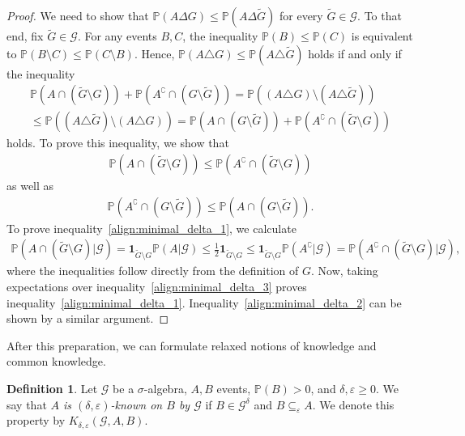 \documentclass[a4paper, 10pt]{article}
\numberwithin{theorem}{section}
\theoremstyle{definition}
\newtheorem{definition}[theorem]{Definition}
\newcommand{\G}{\mathcal{G}}
\newcommand{\ind}[1]{\mathbf{1}_{#1}}
\renewcommand{\epsilon}{\varepsilon}
\renewcommand{\P}{\mathbb{P}}
\begin{document}
\begin{proof}
We need to show that $\P(A \Delta G) \le \P(A \Delta \tilde{G})$ for every $\tilde{G} \in \G$. To that end, fix $\tilde{G} \in \G$. For any events $B,C$, the inequality $\P(B) \leq \P(C)$ is equivalent to $\P(B\setminus C) \leq \P(C\setminus B)$. Hence, $\P(A\triangle G) \leq \P(A \triangle \tilde{G})$
	holds if and only if the inequality
	\begin{align*}
		\P(A \cap (\tilde{G}\setminus G)) + \P(A^\complement \cap (G\setminus \tilde{G})) =	 \P((A \triangle G) \setminus(A\triangle \tilde{G}) ) \\
		 \leq \P((A \triangle \tilde{G}) \setminus(A\triangle G) ) = \P(A \cap (G\setminus \tilde{G})) + \P(A^\complement \cap (\tilde{G}\setminus G))
	\end{align*}
	holds.
	To prove this inequality, we show that 
	\begin{align}\label{align:minimal_delta_1}
		\P(A \cap (\tilde{G}\setminus G)) \leq   \P(A^\complement \cap (\tilde{G}\setminus G)) 
	\end{align}
	as well as 
	\begin{align}  \label{align:minimal_delta_2}
		\P(A^\complement \cap (G\setminus \tilde{G})) \leq  \P(A \cap (G\setminus \tilde{G})). \end{align}
	To prove inequality~\eqref{align:minimal_delta_1}, we calculate
	\begin{align}\label{align:minimal_delta_3}
	\P(A \cap (\tilde{G} \setminus G)| \G)= \ind{\tilde{G} \setminus G}  \P(A|\G) \leq \frac{1}{2} \ind{\tilde{G} \setminus G}  \leq \ind{\tilde{G} \setminus G} \P(A^\complement|\G) = \P(A^\complement \cap (\tilde{G} \setminus G)|\G), \end{align}
	where the inequalities follow directly from the definition of $G$. Now, taking expectations over inequality~\eqref{align:minimal_delta_3} proves inequality~\eqref{align:minimal_delta_1}. Inequality~\eqref{align:minimal_delta_2} can be shown by a similar argument. 
\end{proof}

After this preparation, we can formulate relaxed notions of knowledge and common knowledge.
\begin{definition}
	Let $\G$ be a $\sigma$-algebra, $A,B$ events, $\P(B)>0$, and $\delta,\epsilon \geq 0$. We say that \emph{$A$ is  $(\delta,\epsilon)$-known on $B$ by $\G$} if $B\in \G^\delta$ and $B \subseteq_\epsilon A$. We denote this property by $K_{\delta,\epsilon}(\G, A,B).$
\end{definition}
\end{document}
